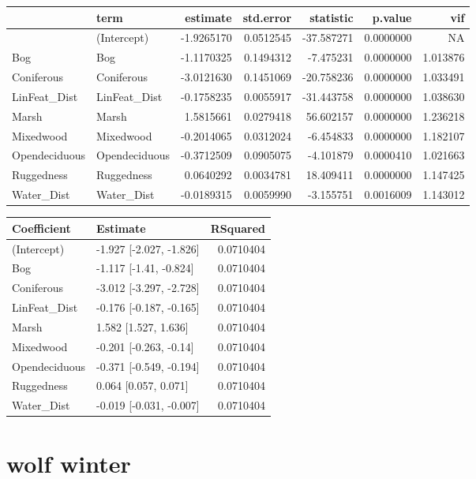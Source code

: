 \documentclass[]{article}
\begin{document}
\begin{tabular}{llrrrrr}
\toprule
  & term & estimate & std.error & statistic & p.value & vif\\
\midrule
 & (Intercept) & -1.9265170 & 0.0512545 & -37.587271 & 0.0000000 & NA\\
Bog & Bog & -1.1170325 & 0.1494312 & -7.475231 & 0.0000000 & 1.013876\\
Coniferous & Coniferous & -3.0121630 & 0.1451069 & -20.758236 & 0.0000000 & 1.033491\\
LinFeat\_Dist & LinFeat\_Dist & -0.1758235 & 0.0055917 & -31.443758 & 0.0000000 & 1.038630\\
Marsh & Marsh & 1.5815661 & 0.0279418 & 56.602157 & 0.0000000 & 1.236218\\
Mixedwood & Mixedwood & -0.2014065 & 0.0312024 & -6.454833 & 0.0000000 & 1.182107\\
Opendeciduous & Opendeciduous & -0.3712509 & 0.0905075 & -4.101879 & 0.0000410 & 1.021663\\
Ruggedness & Ruggedness & 0.0640292 & 0.0034781 & 18.409411 & 0.0000000 & 1.147425\\
Water\_Dist & Water\_Dist & -0.0189315 & 0.0059990 & -3.155751 & 0.0016009 & 1.143012\\
\bottomrule
\end{tabular}

\begin{tabular}{llr}
\toprule
Coefficient & Estimate & RSquared\\
\midrule
(Intercept) & -1.927 [-2.027, -1.826] & 0.0710404\\
Bog & -1.117 [-1.41, -0.824] & 0.0710404\\
Coniferous & -3.012 [-3.297, -2.728] & 0.0710404\\
LinFeat\_Dist & -0.176 [-0.187, -0.165] & 0.0710404\\
Marsh & 1.582 [1.527, 1.636] & 0.0710404\\
Mixedwood & -0.201 [-0.263, -0.14] & 0.0710404\\
Opendeciduous & -0.371 [-0.549, -0.194] & 0.0710404\\
Ruggedness & 0.064 [0.057, 0.071] & 0.0710404\\
Water\_Dist & -0.019 [-0.031, -0.007] & 0.0710404\\
\bottomrule
\end{tabular}

\section{wolf winter}\label{wolf-winter}
\end{document}
